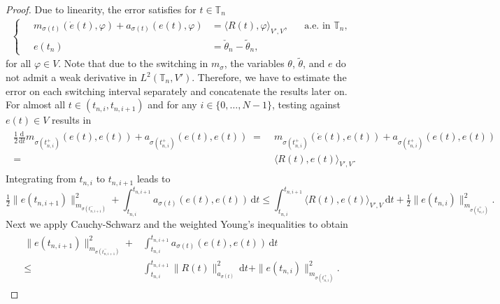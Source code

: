 \documentclass[reqno]{amsart}
\newcommand{\timeInt}{\mathbb{T}}
\newcommand{\state}{\theta}
\newcommand{\dt}{\,\mathrm{d}t}
\newcommand{\ddt}{\tfrac{\mathrm{d}}{\mathrm{d}t}}
\newcommand{\intermediateInitState}{\intermediateState_n}%
\newcommand{\switch}{\sigma}
\newcommand{\reduce}[1]{\tilde{#1}}
\newcommand{\stateRed}{\reduce{\state}}
\newcommand{\intermediateState}{\check{\state}}
\begin{document}
%
\begin{proof}
	Due to linearity, the error satisfies for $t\in\timeInt_n$
	\begin{align*}
		\left\{\quad
    	\begin{aligned}
        	m_{\switch(t)}(\dot{e}(t),\varphi) + a_{\switch(t)}(e(t),\varphi) &= \langle R(t), \varphi\rangle_{V',V},&& \text{a.e.~in $\timeInt_n$},\\ 
       		e(t_n) &= \intermediateInitState - \stateRed_n,
    \end{aligned}\right.
	\end{align*}
	for all $\varphi\in V$. Note that due to the switching in $m_\switch$, the variables $\state$, $\stateRed$, and $e$ do not admit a weak derivative in $L^2(\timeInt_n,V')$. Therefore, we have to estimate the error on each switching interval separately and concatenate the results later on. For almost all $t\in (t_{n,i},t_{n,i+1})$ and for any $i\in \{0,\ldots,N-1\}$, testing against $e(t)\in V$ results in 
    \begin{align}\nonumber
  \begin{aligned}
		\tfrac{1}{2} \ddt m_{\switch(t^{+}_{n,i})}(e(t),e(t)) + a_{\switch(t^{+}_{n,i})}(e(t),e(t)) \;=&\; m_{\switch(t^{+}_{n,i})}(\dot{e}(t),e(t)) + a_{\switch(t^{+}_{n,i})}(e(t),e(t))\\
  =&\; \langle R(t), e(t)\rangle_{V',V}.
  \end{aligned}
	\end{align}
	 Integrating from $t_{n,i}$ to $t_{n,i+1}$ leads to 
    \begin{equation}\nonumber
       \tfrac{1}{2}\|e(t_{n,i+1})\|_{m_{\switch(t^{-}_{n,i+1})}}^2 + \int_{t_{n,i} }^{t_{n,i+1}}a_{\switch(t)}(e(t),e(t))\dt  \leq \int_{t_{n,i}}^{t_{n,i+1}} \langle R(t), e(t)\rangle_{V',V}\dt + \tfrac{1}{2} \|e(t_{n,i})\|_{m_{\switch(t^{+}_{n,i})}}^2.
    \end{equation}
    Next we apply Cauchy-Schwarz and the weighted Young's inequalities to obtain
    \begin{align}\label{eqn:stateBound:tmp2}
    \begin{aligned}
       \|e(t_{n,i+1})\|_{m_{\switch(t^{-}_{n,i+1})}}^2 +& \int_{t_{n,i} }^{t_{n,i+1}}a_{\switch(t)}(e(t),e(t))\dt \\ 
       \leq& \int_{t_{n,i}}^{t_{n,i+1}} \|R(t)\|^2_{{a_{\switch(t)}}}\dt + \|e(t_{n,i})\|_{m_{\switch(t^{+}_{n,i})}}^2.
    \end{aligned}
    \end{align}

\end{proof}
\end{document}
